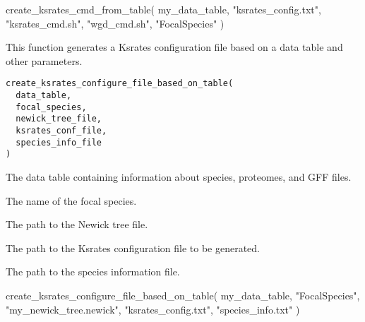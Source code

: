 \documentclass[a4paper]{book}
\begin{document}
%
\begin{Examples}
\begin{ExampleCode}
create_ksrates_cmd_from_table(
  my_data_table,
  "ksrates_config.txt",
  "ksrates_cmd.sh",
  "wgd_cmd.sh",
  "FocalSpecies"
)
\end{ExampleCode}
\end{Examples}
%
\begin{Description}\relax
This function generates a Ksrates configuration file based on a data table and other parameters.
\end{Description}
%
\begin{Usage}
\begin{verbatim}
create_ksrates_configure_file_based_on_table(
  data_table,
  focal_species,
  newick_tree_file,
  ksrates_conf_file,
  species_info_file
)
\end{verbatim}
\end{Usage}
%
\begin{Arguments}
\begin{ldescription}
\item[\code{data\_table}] The data table containing information about species, proteomes, and GFF files.

\item[\code{focal\_species}] The name of the focal species.

\item[\code{newick\_tree\_file}] The path to the Newick tree file.

\item[\code{ksrates\_conf\_file}] The path to the Ksrates configuration file to be generated.

\item[\code{species\_info\_file}] The path to the species information file.
\end{ldescription}
\end{Arguments}
%
\begin{Examples}
\begin{ExampleCode}
create_ksrates_configure_file_based_on_table(
  my_data_table,
  "FocalSpecies",
  "my_newick_tree.newick",
  "ksrates_config.txt",
  "species_info.txt"
)
\end{ExampleCode}
\end{Examples}
\end{document}
